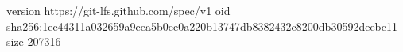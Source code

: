 version https://git-lfs.github.com/spec/v1
oid sha256:1ee44311a032659a9eea5b0ee0a220b13747db8382432c8200db30592deebc11
size 207316

